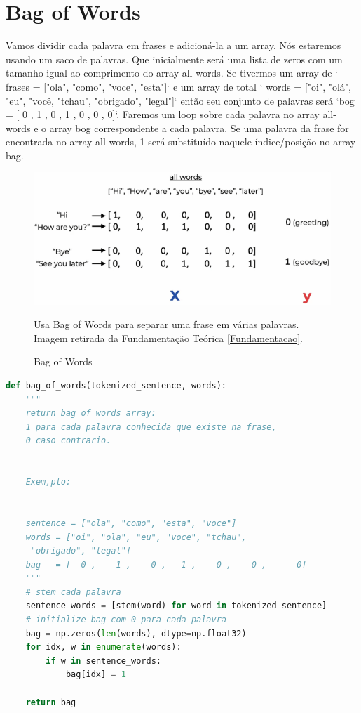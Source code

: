 \section[Bag of Words]{Bag of Words}
Vamos dividir cada palavra em frases e adicioná-la a um array. Nós estaremos usando um saco de palavras. Que inicialmente será uma lista de zeros com um tamanho igual ao comprimento do array all-words. Se tivermos um array de ` frases = ["ola", "como", "voce", "esta"]` e um array de total ` words = ["oi", "olá", "eu", "você, "tchau", "obrigado", "legal"]` então seu conjunto de palavras será `bog = [ 0 , 1 , 0 , 1 , 0 , 0 , 0]`. Faremos um loop sobre cada palavra no array all-words e o array bog correspondente a cada palavra. Se uma palavra da frase for encontrada no array all words, 1 será substituído naquele índice/posição no array bag.
\justifying


\begin{figure}[H]
   \begin{center}
      \includegraphics[width=15cm]{img/bagofwords.png}
      \caption{Bag of Words} \label{BagofWords}
      \medskip
      \small
      Usa Bag of Words para separar uma frase em várias palavras. Imagem retirada da Fundamentação Teórica \ref{Fundamentacao}.
   \end{center}
\end{figure}


\begin{lstlisting}[language=Python, caption=Python Bag of Words]
def bag_of_words(tokenized_sentence, words):
    """
    return bag of words array:
    1 para cada palavra conhecida que existe na frase,
    0 caso contrario.


    Exem,plo:


    sentence = ["ola", "como", "esta", "voce"]
    words = ["oi", "ola", "eu", "voce", "tchau",
     "obrigado", "legal"]
    bag   = [  0 ,    1 ,    0 ,   1 ,    0 ,    0 ,      0]
    """
    # stem cada palavra
    sentence_words = [stem(word) for word in tokenized_sentence]
    # initialize bag com 0 para cada palavra
    bag = np.zeros(len(words), dtype=np.float32)
    for idx, w in enumerate(words):
        if w in sentence_words:
            bag[idx] = 1

    return bag

\end{lstlisting}

